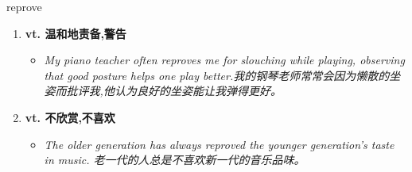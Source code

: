 
\begin{frame}
{\huge reprove}
\begin{center}
\begin{enumerate}\Large
  \item \textbf{vt. 温和地责备,警告}
  \begin{itemize}
    \item \em{\Large{My piano teacher often reproves me for slouching while playing, observing that good posture helps one play better.我的钢琴老师常常会因为懒散的坐姿而批评我,他认为良好的坐姿能让我弹得更好。}}
  \end{itemize}
  \item \textbf{vt. 不欣赏,不喜欢}
  \begin{itemize}
    \item \em{\Large{The older generation has always reproved the younger generation's taste in music. 老一代的人总是不喜欢新一代的音乐品味。}}
  \end{itemize}
\end{enumerate}
\end{center}
\end{frame}
